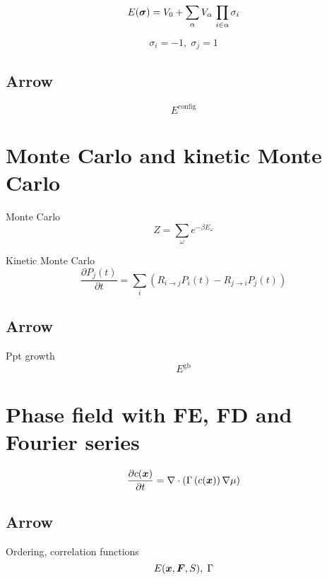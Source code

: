 \documentclass[11pt]{article}
\begin{document}
\begin{displaymath}
E(\mbox{\boldmath$\sigma$}) = V_0 + \sum_{\alpha} V_\alpha\,\prod_{i\in\alpha}\sigma_i
\end{displaymath}

\begin{displaymath}
\sigma_i = -1,\;\sigma_j = 1
\end{displaymath}

\subsection*{Arrow}
\begin{displaymath}
E^\mathrm{config}
\end{displaymath}

\section*{Monte Carlo and kinetic Monte Carlo}
Monte Carlo
\begin{displaymath}
Z = \sum \limits_\omega e^{-\beta E_\omega}
\end{displaymath}

Kinetic Monte Carlo
\begin{displaymath}
\frac{\partial P_j(t)}{\partial t} = \sum \limits_i \left(R_{i\rightarrow j}P_i(t) - R_{j\rightarrow i}P_j(t)\right)
\end{displaymath}

\subsection*{Arrow}
Ppt growth
\begin{displaymath}
E^\mathrm{gb}
\end{displaymath}

\section*{Phase field with FE, FD and Fourier series}
\begin{displaymath}
\frac{\partial c(\mbox{\boldmath$ x$})}{\partial t} = \nabla\cdot\left(\Gamma\left(c(\mbox{\boldmath$ x$})\right)\nabla\mu\right)
\end{displaymath}

\subsection*{Arrow}
Ordering, correlation functions
\begin{displaymath}
E(\mbox{\boldmath$ x$},\mbox{\boldmath$ F$},S),\;\Gamma
\end{displaymath}
\end{document}
